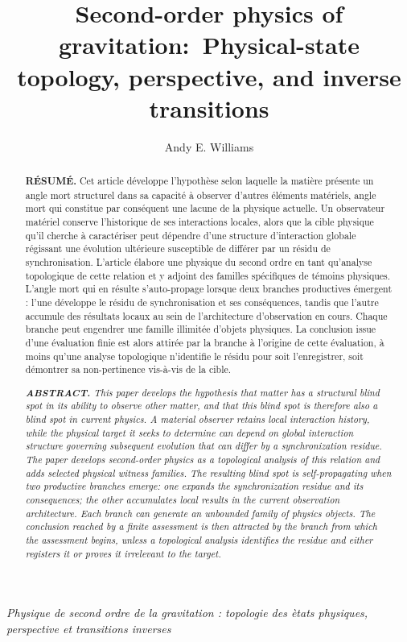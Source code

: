 \documentclass[10pt,twoside,a5paper]{article}
\title{Second-order physics of gravitation:\
Physical-state topology, perspective, and inverse transitions}
\author{Andy E. Williams}
\theoremstyle{definition}
\begin{document}
\maketitle

\begin{center}
\small\itshape Physique de second ordre de la gravitation :
topologie des \`etats physiques, perspective et transitions inverses
\end{center}
\vskip 4pt
\begin{abstract}
\textbf{R\'ESUM\'E.} Cet article développe l'hypothèse selon laquelle la matière présente un angle mort structurel dans sa capacité à observer d'autres éléments matériels, angle mort qui constitue par conséquent une lacune de la physique actuelle. Un observateur matériel conserve l'historique de ses interactions locales, alors que la cible physique qu'il cherche à caractériser peut dépendre d'une structure d'interaction globale régissant une évolution ultérieure susceptible de différer par un résidu de synchronisation. L'article élabore une physique du second ordre en tant qu'analyse topologique de cette relation et y adjoint des familles spécifiques de témoins physiques. L'angle mort qui en résulte s'auto-propage lorsque deux branches productives émergent : l'une développe le résidu de synchronisation et ses conséquences, tandis que l'autre accumule des résultats locaux au sein de l'architecture d'observation en cours. Chaque branche peut engendrer une famille illimitée d'objets physiques. La conclusion issue d'une évaluation finie est alors attirée par la branche à l'origine de cette évaluation, à moins qu'une analyse topologique n'identifie le résidu pour soit l'enregistrer, soit démontrer sa non-pertinence vis-à-vis de la cible.

{\it
\textbf{ABSTRACT.} This paper develops the hypothesis that matter has a structural blind spot in its ability to observe other matter, and that this blind spot is therefore also a blind spot in current physics. A material observer retains local interaction history, while the physical target it seeks to determine can depend on global interaction structure governing subsequent evolution that can differ by a synchronization residue. The paper develops second-order physics as a topological analysis of this relation and adds selected physical witness families. The resulting blind spot is self-propagating when two productive branches emerge: one expands the synchronization residue and its consequences; the other accumulates local results in the current observation architecture. Each branch can generate an unbounded family of physics objects. The conclusion reached by a finite assessment is then attracted by the branch from which the assessment begins, unless a topological analysis identifies the residue and either registers it or proves it irrelevant to the target. }
\end{abstract}
\end{document}
